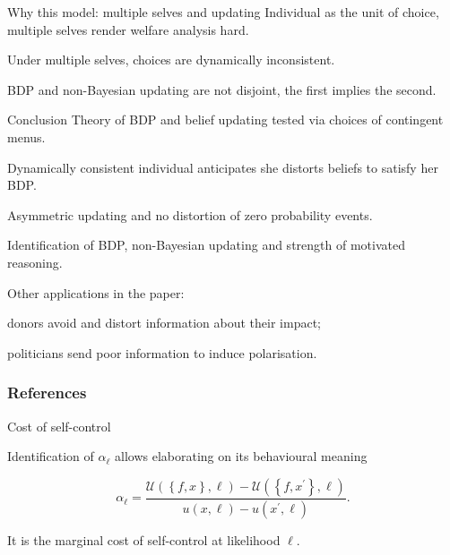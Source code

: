 \documentclass[usenames,dvipsnames,aspectratio=169,11pt, envcountsect, handout]{beamer}
\begin{document}
\begin{frame}{Why this model: multiple selves and updating}
	Individual as the unit of choice, multiple selves render welfare analysis hard.

	\vfill

	Under multiple selves, choices are dynamically inconsistent.

	\vfill

	BDP and non-Bayesian updating are not disjoint, the first implies the second.
\end{frame}


\begin{frame}{Conclusion}
	Theory of BDP and belief updating tested via choices of contingent menus.

	\vfill

	Dynamically consistent individual anticipates she distorts beliefs to satisfy her BDP.

	\vfill

	Asymmetric updating and no distortion of zero probability events.

	\vfill

	Identification of BDP, non-Bayesian updating and strength of motivated reasoning.

	\vfill

	Other applications in the paper:

	\vfill

	\begin{wideitemize}
		\item donors avoid and distort information about their impact;
		\item politicians send poor information to induce polarisation.
	\end{wideitemize}

\end{frame}

\begin{frame}

	\frametitle{References}

	
	


\end{frame}

\appendix

\begin{frame}{Cost of self-control}\label{alpha}

	Identification of \( \alpha_{\ell} \) allows elaborating on its behavioural meaning

	\vfill

	\[
		\alpha_{\ell} = \frac{\mathcal{U} \left( \left\{f, x \right\}, \ell \right) - \mathcal{U} \left( \left\{f, x^{\prime} \right\}, \ell \right) }{u \left( x , \ell \right) - u \left( x^{\prime} , \ell \right)} .
	\]

	\vfill

	It is the marginal cost of self-control at likelihood \( \ell \). \hyperlink{fullmodel}{}

\end{frame}
\end{document}
